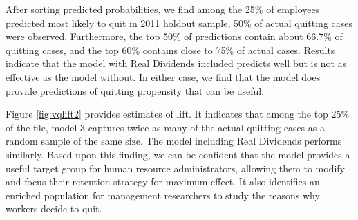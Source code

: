 \documentclass[12pt,letterpaper]{article}
\begin{document}
After sorting predicted probabilities, we find among the 25\% of employees predicted most likely to quit in 2011 holdout sample, 50\% of actual quitting cases were observed. Furthermore, the top 50\% of predictions contain about 66.7\% of quitting cases, and the top 60\% contains close to 75\% of actual cases. Results indicate that the model with Real Dividends included predicts well but is not as effective as the model without.  In either case, we find that the model does provide predictions of quitting propensity that can be useful.


Figure \ref{fig:vqlift2} provides estimates of lift.  It indicates that among the top 25\% of the file, model 3 captures twice as many of the actual quitting cases as a random sample of the same size.  The model including Real Dividends performs similarly.  Based upon this finding, we can be confident that the model provides a useful target group for human resource administrators, allowing them to modify and focus their retention strategy for maximum effect. It also identifies an enriched population for management researchers to study the reasons why workers decide to quit.

\end{document}
